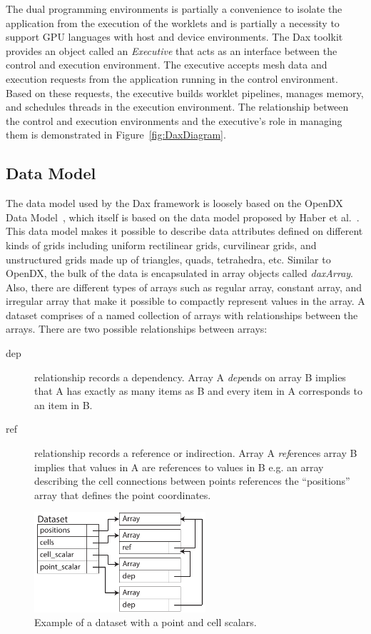 \documentclass{vgtc}                          %
\newcommand*{\lcite}[1]{~\cite{#1}}
\newcommand*{\scite}[1]{~\cite{#1}}
\newcommand*{\keyterm}[1]{\emph{#1}}
\newcommand{\etal}{et al.}
\begin{document}
The dual programming environments is partially a convenience to isolate the
application from the execution of the worklets and is partially a necessity to
support GPU languages with host and device environments.  The Dax toolkit
provides an object called an \keyterm{Executive} that acts as an interface
between the control and execution environment.  The executive accepts mesh data
and execution requests from the application running in the control environment.
Based on these requests, the executive builds worklet pipelines, manages memory,
and schedules threads in the execution environment.  The relationship between
the control and execution environments and the executive's role in managing them
is demonstrated in Figure~\ref{fig:DaxDiagram}.

\subsection{Data Model}
\label{sec:DataModel}

The data model used by the Dax framework is loosely based on the OpenDX Data Model\lcite{OpenDXManual},
which itself is based on the data model proposed by Haber \etal\scite{Haber1991}.
This data model makes it possible to describe data attributes defined on
different kinds of grids including uniform rectilinear grids, curvilinear grids,
and unstructured grids made up of triangles, quads, tetrahedra, etc. Similar
to OpenDX, the bulk of the data is encapsulated in array objects called
\emph{daxArray}. Also, there are different types of arrays such as
regular array, constant array, and irregular array that make it possible to
compactly represent values in the array. A dataset comprises of a named
collection of arrays with relationships between the arrays. There are two
possible relationships between arrays:
\begin{description}
\item[dep] relationship records a dependency. Array A \emph{dep}ends on
array B implies that A has exactly as many items as B and every item in A
corresponds to an item in B.
\item[ref] relationship records a reference or indirection. Array A
\emph{ref}erences array B implies that values in A are references to values in
B e.g. an array describing the cell connections between points references the
``positions'' array that defines the point coordinates.
\end{description}

\begin{figure}
  \centering
  \includegraphics[width=2.5in]{images/DaxDataModel}
  \caption{Example of a dataset with a point and cell scalars.}
  \label{fig:DaxDataModel}
\end{figure}
\end{document}
